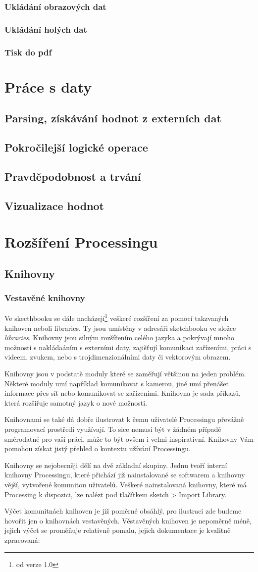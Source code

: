 \documentclass[11pt]{book}
\newcommand{\oddil}[1]{\section{#1}\label{sec:#1}}
\newcommand{\pododdil}[1]{\subsection{#1}\label{subsec:#1}}
\begin{document}
\pododdil{Ukládání obrazových dat}
\pododdil{Ukládání holých dat}
\pododdil{Tisk do pdf}



\chapter{Práce s daty}


\oddil{Parsing, získávání hodnot z externích dat}

\oddil{Pokročilejší logické operace}

\oddil{Pravděpodobnost a trvání}


\oddil{Vizualizace hodnot}


\chapter{Rozšíření Processingu}
\oddil{Knihovny}

\pododdil{Vestavěné knihovny}

Ve skecthbooku se dále nacházejí\footnote{od verze 1.0} veškeré rozšíření za pomocí takzvaných knihoven neboli libraries. Ty jsou umístěny v adresáři sketchbooku ve složce {\em libraries}. Knihovny jsou silným rozšířením celého jazyka a pokrývají mnoho možností s nakládaáním s externími daty, zajišťují komunikaci zařízeními, práci s videem, zvukem, nebo s trojdimenzionálními daty či vektorovým obrazem.


Knihovny jsou v podstatě moduly které se zaměřují většinou na jeden problém. Některé moduly umí například komunikovat s kamerou, jiné umí přenášet informace přes síť nebo komunikovat se zařízeními. Knihovna je sada příkazů, která rozšiřuje samotný jazyk o nové možnosti.


Knihovnami se také dá dobře ilustrovat k čemu uživatelé Processingu převážně programovací prostředí využívají. To sice nemusí být v žádném případě směrodatné pro vaší práci, může to být ovšem i velmi inspirativní. Knihovny Vám pomohou získat jistý přehled o kontextu užívání Processingu.

Knihovny se  nejobecněji dělí na dvě základní skupiny. Jednu tvoří interní knihovny Processingu, které přichází již nainstalované se softwarem a knihovny vější, vytvořené komunitou uživatelů. Veškeré nainstalovaná knihovny, které má Processing k dispozici, lze nalézt pod tlačítkem sketch > Import Library.


Výčet komunitnách knihoven je již poměrné obsáhlý, pro ilustraci zde budeme hovořit jen o knihovnách vestavěných. Věstavěných knihoven je nepoměrně méně, jejich výčet se proměňuje relativně pomalu, jejich dokumentace je kvalitně zpracovaná:
\end{document}
